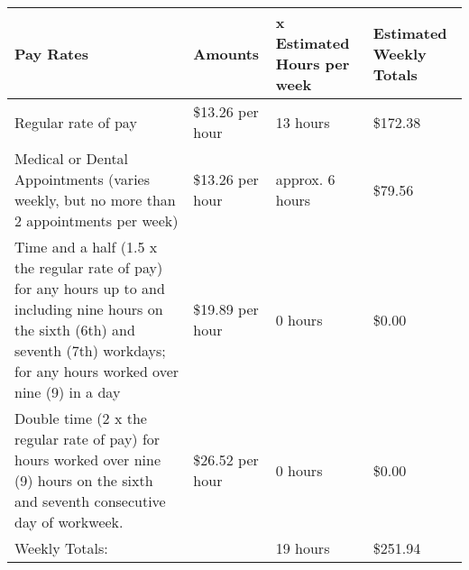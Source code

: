 \documentclass[]{article}
\newcommand{\sw}{.15\textwidth}
\newcommand{\bw}{.39\textwidth}
\begin{document}
\begin{enumerate}
\begin{tabular}{|p{\bw}|p{\sw}|p{\sw}|p{\sw}|}
			\rowcolor{medgray}
			Pay Rates & Amounts & x Estimated Hours per week & Estimated Weekly Totals\\ \hline
			Regular rate of pay & \$13.26 per hour & 13 hours & \$172.38\\ \hline
			Medical or Dental Appointments (varies weekly, but no more than 2 appointments per week) & \$13.26 per hour & approx. 6 hours & \$79.56\\ \hline
			Time and a half (1.5 x the regular rate of pay) for any hours up to and including nine hours on the sixth (6th) and seventh (7th) workdays; for any hours worked over nine (9) in a day & \$19.89 per hour & 0 hours & \$0.00\\ \hline
			Double time (2 x the regular rate of pay) for hours worked over nine (9) hours on the sixth and seventh consecutive day of workweek. & \$26.52 per hour & 0 hours & \$0.00\\ \hline
			Weekly Totals: & & 19 hours & \$251.94\\
			\hline
		\end{tabular}
\end{enumerate}
\end{document}
